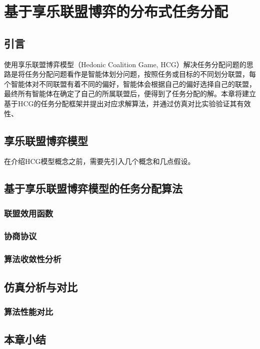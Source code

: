 
\chapter{基于享乐联盟博弈的分布式任务分配}
\label{chap:hedonic}

\section{引言}
\label{hg:sec:intro}

使用享乐联盟博弈模型（Hedonic Coalition Game, HCG）解决任务分配问题的思路是将任务分配问题看作是智能体划分问题，按照任务或目标的不同划分联盟，每个智能体对不同联盟有着不同的偏好，智能体会根据自己的偏好选择自己的联盟，最终所有智能体在确定了自己的所属联盟后，便得到了任务分配的解。本章将建立基于HCG的任务分配框架并提出对应求解算法，并通过仿真对比实验验证其有效性、

\section{享乐联盟博弈模型}
\label{hg:sec:hgmodel}

在介绍HCG模型概念之前，需要先引入几个概念和几点假设。

\section{基于享乐联盟博弈模型的任务分配算法}
\label{hg:sec:HGTA}

\subsection{联盟效用函数}
\label{hgta:sub:coalition}

\subsection{协商协议}
\label{hgta:sub:nego}

\subsection{算法收敛性分析}
\label{hgta:sub:convergence}

\section{仿真分析与对比}
\label{hg:sec:simulation}

\subsection{算法性能对比}
\label{simu:sub:conpare}

\section{本章小结}
\label{hg:sec:conclusion}




